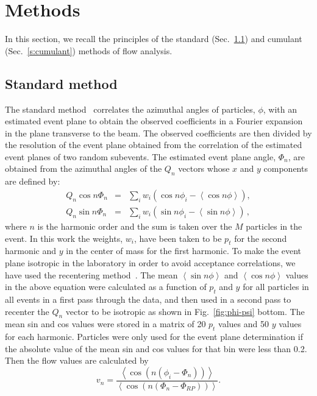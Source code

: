 \documentclass[aps,prc,superscriptaddress,showpacs,floatfix,nofootinbib]{revtex4}
\newcommand{\mean}[1]{\left\langle #1 \right\rangle}
\begin{document}
\section{Methods}
\label{s:methods}

In this section, we recall the principles of the standard 
(Sec.~\ref{s:standard}) and cumulant (Sec.~\ref{s:cumulant})
methods of flow analysis.


\subsection{Standard method}
\label{s:standard}

The standard method~\cite{Ollitrault:1997di,Poskanzer:1998yz} correlates 
the azimuthal angles of particles, $\phi$, with an estimated event plane 
to obtain the observed coefficients in a Fourier expansion in the plane
transverse to the beam. The observed coefficients are then divided by
the resolution of the event plane obtained from the correlation of the
estimated event planes of two random subevents. The estimated event
plane angle, $\Phi_n$, are obtained from the azimuthal angles of the
$Q_n$ vectors whose $x$ and $y$ components are defined by:
\begin{eqnarray}   
Q_n \cos n\Phi_n &=& \sum_i w_i \left ( \cos n\phi_i - \mean{\cos
n\phi} \right ), \nonumber 
\\     
Q_n \sin n\Phi_n & =& \sum_i w_i \left (\sin n\phi_i - \mean{\sin
n\phi} \right ) \,,      
\label{eq:Q_n}    
\end{eqnarray}   
where $n$ is the harmonic order and the sum is taken over the $M$
particles in the event. In this work the weights, $w_i$, have been
taken to be $p_t$ for the second harmonic and $y$ in the center of
mass for the first harmonic. To make the event plane isotropic in the
laboratory in order to avoid acceptance correlations, we have used the
recentering method~\cite{Poskanzer:1998yz}. The mean $\mean{\sin
n\phi}$ and $\mean{\cos n\phi}$ values in the above equation were
calculated as a function of $p_t$ and $y$ for all particles in all
events in a first pass through the data, and then used in a second
pass to recenter the $Q_n$ vector to be isotropic as shown in
Fig.~\ref{fig:phi-psi} bottom. The mean sin and cos values were stored
in a matrix of 20 $p_t$ values and 50 $y$ values for each
harmonic. Particles were only used for the event plane determination
if the absolute value of the mean sin and cos values for that bin were
less than 0.2. Then the flow values are calculated by
\begin{equation}
\label{eq:v}
v_n = \frac{\mean{\cos(n(\phi_i - \Phi_n))}} {\mean{\cos(n(\Phi_n - \Phi_{RP}))}}.
\end{equation} 
\end{document}
